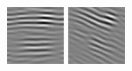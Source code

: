\begin{figure}
\begin{center}
  \includegraphics[width=\columnwidth/9]{ch4/figures/imag_1_4.jpg}
  \includegraphics[width=\columnwidth/9]{ch4/figures/imag_1_5.jpg}

\end{center}
\end{figure}
